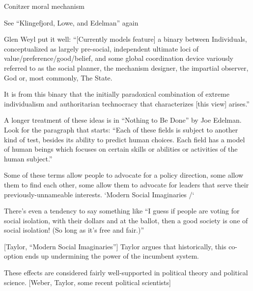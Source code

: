 \begin{thebibliography}{99}
 Conitzer moral mechanism

 See ``Klingefjord, Lowe, and Edelman'' again

 Glen Weyl put it well:
``[Currently models feature] a binary between Individuals, conceptualized as largely pre-social, independent ultimate loci of value/preference/good/belief, and some global coordination device variously referred to as the social planner, the mechanism designer, the impartial observer, God or, most commonly, The State.

It is from this binary that the initially paradoxical combination of extreme individualism and authoritarian technocracy that characterizes [this view] arises.''

 A longer treatment of these ideas is in ``Nothing to Be Done'' by Joe Edelman. Look for the paragraph that starts:
``Each of these fields is subject to another kind of test, besides its ability to predict human choices. Each field has a model of human beings which focuses on certain skills or abilities or activities of the human subject.''

 Some of these terms allow people to advocate for a policy direction, some allow them to find each other, some allow them to advocate for leaders that serve their previously-unnameable interests. `Modern Social Imaginaries /`

 There's even a tendency to say something like ``I guess if people are voting for social isolation, with their dollars and at the ballot, then a good society is one of social isolation! (So long as it's free and fair.)''

 [Taylor, ``Modern Social Imaginaries''] Taylor argues that historically, this co-option ends up undermining the power of the incumbent system.

 These effects are considered fairly well-supported in political theory and political science. [Weber, Taylor, some recent political scientists]

\end{thebibliography}

